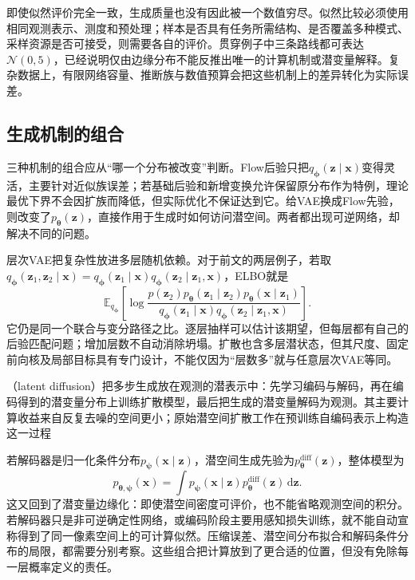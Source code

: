 即使似然评价完全一致，生成质量也没有因此被一个数值穷尽。似然比较必须使用相同观测表示、测度和预处理；样本是否具有任务所需结构、是否覆盖多种模式、采样资源是否可接受，则需要各自的评价。贯穿例子中三条路线都可表达$\mathcal{N}(0,5)$，已经说明仅由边缘分布不能反推出唯一的计算机制或潜变量解释。复杂数据上，有限网络容量、推断族与数值预算会把这些机制上的差异转化为实际误差。

\subsection{生成机制的组合}
\label{sec:pgm-generative-hybrids}

三种机制的组合应从“哪一个分布被改变”判断。Flow后验只把$q_{\bm{\phi}}(\bm{z}\mid\bm{x})$变得灵活，主要针对近似族误差；若基础后验和新增变换允许保留原分布作为特例，理论最优下界不会因扩族而降低，但实际优化不保证达到它。给VAE换成Flow先验，则改变了$p_{\bm{\theta}}(\bm{z})$，直接作用于生成时如何访问潜空间。两者都出现可逆网络，却解决不同的问题。

层次VAE把复杂性放进多层随机依赖。对于前文的两层例子，若取$q_{\bm{\phi}}(\bm{z}_1,\bm{z}_2\mid\bm{x})=q_{\bm{\phi}}(\bm{z}_1\mid\bm{x})q_{\bm{\phi}}(\bm{z}_2\mid\bm{z}_1,\bm{x})$，ELBO就是
\[
  \mathbb{E}_{q_{\bm{\phi}}}
  \left[
    \log\frac{
      p(\bm{z}_2)p_{\bm{\theta}}(\bm{z}_1\mid\bm{z}_2)
          p_{\bm{\theta}}(\bm{x}\mid\bm{z}_1)}
      {q_{\bm{\phi}}(\bm{z}_1\mid\bm{x})
          q_{\bm{\phi}}(\bm{z}_2\mid\bm{z}_1,\bm{x})}
  \right].
\]
它仍是同一个联合与变分路径之比。逐层抽样可以估计该期望，但每层都有自己的后验匹配问题；增加层数不自动消除坍塌。扩散也含多层潜状态，但其尺度、固定前向核及局部目标具有专门设计，不能仅因为“层数多”就与任意层次VAE等同。

（latent diffusion）把多步生成放在观测的潜表示中：先学习编码与解码，再在编码得到的潜变量分布上训练扩散模型，最后把生成的潜变量解码为观测。其主要计算收益来自反复去噪的空间更小；原始潜空间扩散工作在预训练自编码表示上构造这一过程

若解码器是归一化条件分布$p_{\bm{\psi}}(\bm{x}\mid\bm{z})$，潜空间生成先验为$p_{\bm{\theta}}^{\mathrm{diff}}(\bm{z})$，整体模型为
\begin{equation}
  \label{eq:pgm-generative-latent-diffusion}
  p_{\bm{\theta},\bm{\psi}}(\bm{x})
  =\int p_{\bm{\psi}}(\bm{x}\mid\bm{z})
          p_{\bm{\theta}}^{\mathrm{diff}}(\bm{z})\,\mathrm{d}\bm{z}.
\end{equation}
这又回到了潜变量边缘化：即使潜空间密度可评价，也不能省略观测空间的积分。若解码器只是非可逆确定性网络，或编码阶段主要用感知损失训练，就不能自动宣称得到了同一像素空间上的可计算似然。压缩误差、潜空间分布拟合和解码条件分布的局限，都需要分别考察。这些组合把计算放到了更合适的位置，但没有免除每一层概率定义的责任。

